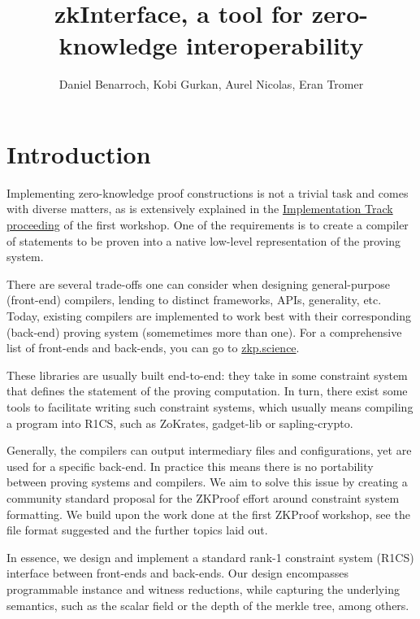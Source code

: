 \documentclass[a4paper,11pt]{article}
\title{zkInterface, a tool for zero-knowledge interoperability}
\author{Daniel Benarroch, Kobi Gurkan, Aurel Nicolas, Eran Tromer}
\begin{document}
		
		\maketitle
		
			
		
		\section{Introduction}
		Implementing zero-knowledge proof constructions is not a trivial task and comes with diverse matters, as is extensively explained in the \href{https://zkproof.org/proceedings-snapshots/zkproof-implementation-20180801.pdf}{Implementation Track proceeding} of the first workshop. One of the requirements is to create a compiler of statements to be proven into a native low-level representation of the proving system.
		
		There are several trade-offs one can consider when designing general-purpose (front-end) compilers, lending to distinct frameworks, APIs, generality, etc. Today, existing compilers are implemented to work best with their corresponding (back-end) proving system (somemetimes more than one). For a comprehensive list of front-ends and back-ends, you can go to \href{https://zkp.science}{zkp.science}. 
		
		These libraries are usually built end-to-end: they take in some constraint system that defines the statement of the proving computation. In turn, there exist some tools to facilitate writing such constraint systems, which usually means compiling a program into R1CS, such as ZoKrates, gadget-lib or sapling-crypto.
		
		Generally, the compilers can output intermediary files and configurations, yet are used for a specific back-end. In practice this means there is no portability between proving systems and compilers. We aim to solve this issue by creating a community standard proposal for the ZKProof effort around constraint system formatting. We build upon the work done at the first ZKProof workshop, see the file format suggested and the further topics laid out. 
		
		In essence, we design and implement a standard rank-1 constraint system (R1CS) interface between front-ends and back-ends. Our design encompasses programmable instance and witness reductions, while capturing the underlying semantics, such as the scalar field or the depth of the merkle tree, among others.
		
\end{document}
